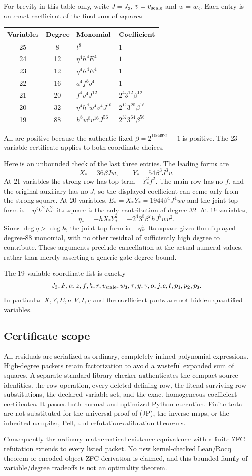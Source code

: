 For brevity in this table only, write $J=J_3$, $v=v_{\rm scale}$ and
$w=w_3$.  Each entry is an exact coefficient of the final sum of squares.
\begin{center}
\begin{tabular}{ccll}
Variables & Degree & Monomial & Coefficient\\\hline
25 & 8  & $t^8$ & $1$\\
24 & 12 & $\eta^4h^4E^4$ & $1$\\
23 & 12 & $\eta^4h^4E^4$ & $1$\\
22 & 16 & $a^4f^8o^4$ & $1$\\
21 & 20 & $f^4v^4J^{12}$ & $2^4 3^{12}\beta^{12}$\\
20 & 32 & $\eta^4h^4w^4v^4J^{16}$ & $2^{12}3^{20}\beta^{16}$\\
19 & 88 & $h^8w^8v^{16}J^{56}$ & $2^{32}3^{64}\beta^{56}$
\end{tabular}
\end{center}
All are positive because the authentic fixed $\beta=2^{1064921}-1$ is
positive.  The 23-variable certificate applies to both coordinate choices.

Here is an unbounded check of the last three entries.  The leading forms
are
\[
 X_*=36\beta Jw,\qquad Y_*=54\beta^3J^3v.
\]
At 21 variables the strong row has top term $-Y_*^2f^2$.
The main row has no $f$, and the original auxiliary has no $J$, so the
displayed coefficient can come only from the strong square.
At 20 variables, $E_*=X_*Y_*=1944\beta^4J^4wv$ and the joint top form is
$-\eta^2h^2E_*^2$; its square is the only contribution of degree 32.
At 19 variables,
\[
 \eta_*=-hX_*Y_*^2=-2^4 3^8\beta^7 hJ^7wv^2.
\]
Since $\deg\eta>\deg k$, the joint top form is $-\eta_*^4$.
Its square gives the displayed degree-88 monomial, with no other residual
of sufficiently high degree to contribute.  These arguments preclude
cancellation at the actual numeral values, rather than merely asserting
a generic gate-degree bound.

The 19-variable coordinate list is exactly
\[
 J_3,F,\alpha,z,f,h,r,v_{\rm scale},w_3,\tau,y,\gamma,o,j,c,
 t,p_1,p_2,p_3.
\]
In particular $X,Y,E,a,V,I,\eta$ and the coefficient ports are not hidden
quantified variables.

\subsection{Certificate scope}

All residuals are serialized as ordinary, completely inlined polynomial
expressions.  High-degree packets retain factorization to avoid a wasteful
expanded sum of squares.  A separate standard-library checker authenticates
the compact source identities, the row operation, every deleted defining
row, the literal surviving-row substitutions, the declared variable set,
and the exact homogeneous coefficient certificates.  It passes both
normal and optimized Python execution.  Finite tests are not substituted
for the universal proof of (JP), the inverse maps, or the inherited
compiler, Pell, and refutation-calibration theorems.

Consequently the ordinary mathematical existence equivalence with a finite
ZFC refutation extends to every listed packet.  No new kernel-checked
Lean/Rocq theorem or encoded object-ZFC derivation is claimed, and this
bounded family of variable/degree tradeoffs is not an optimality theorem.
